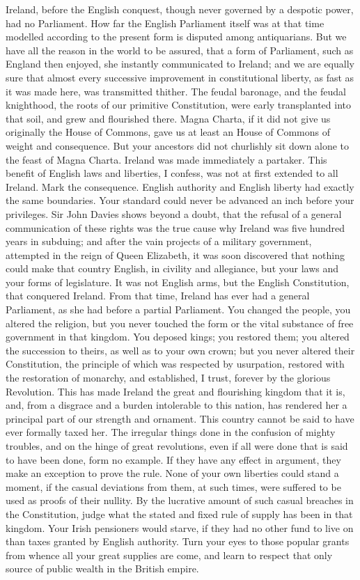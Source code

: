 Ireland, before the English conquest, though never governed by a despotic power, had no Parliament. How far the English Parliament itself was at that time modelled according to the present form is disputed among antiquarians. But we have all the reason in the world to be assured, that a form of Parliament, such as England then enjoyed, she instantly communicated to Ireland; and we are equally sure that almost every successive improvement in constitutional liberty, as fast as it was made here, was transmitted thither. The feudal baronage, and the feudal knighthood, the roots of our primitive Constitution, were early transplanted into that soil, and grew and flourished there. Magna Charta, if it did not give us originally the House of Commons, gave us at least an House of Commons of weight and consequence. But your ancestors did not churlishly sit down alone to the feast of Magna Charta. Ireland was made immediately a partaker. This benefit of English laws and liberties, I confess, was not at first extended to all Ireland. Mark the consequence. English authority and English liberty had exactly the same boundaries. Your standard could never be advanced an inch before your privileges. Sir John Davies shows beyond a doubt, that the refusal of a general communication of these rights was the true cause why Ireland was five hundred years in subduing; and after the vain projects of a military government, attempted in the reign of Queen Elizabeth, it was soon discovered that nothing could make that country English, in civility and allegiance, but your laws and your forms of legislature. It was not English arms, but the English Constitution, that conquered Ireland. From that time, Ireland has ever had a general Parliament, as she had before a partial Parliament. You changed the people, you altered the religion, but you never touched the form or the vital substance of free government in that kingdom. You deposed kings; you restored them; you altered the succession to theirs, as well as to your own crown; but you never altered their Constitution, the principle of which was respected by usurpation, restored with the restoration of monarchy, and established, I trust, forever by the glorious Revolution. This has made Ireland the great and flourishing kingdom that it is, and, from a disgrace and a burden intolerable to this nation, has rendered her a principal part of our strength and ornament. This country cannot be said to have ever formally taxed her. The irregular things done in the confusion of mighty troubles, and on the hinge of great revolutions, even if all were done that is said to have been done, form no example. If they have any effect in argument, they make an exception to prove the rule. None of your own liberties could stand a moment, if the casual deviations from them, at such times, were suffered to be used as proofs of their nullity. By the lucrative amount of such casual breaches in the Constitution, judge what the stated and fixed rule of supply has been in that kingdom. Your Irish pensioners would starve, if they had no other fund to live on than taxes granted by English authority. Turn your eyes to those popular grants from whence all your great supplies are come, and learn to respect that only source of public wealth in the British empire.

